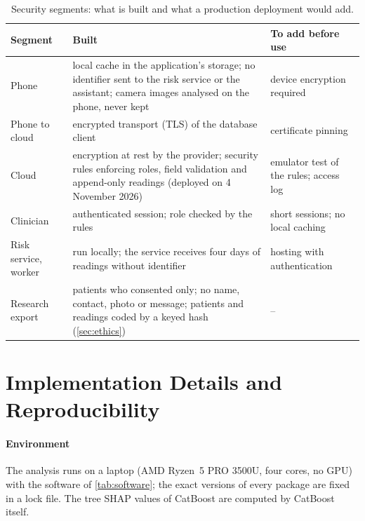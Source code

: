 \begin{table}[htbp]
\centering\footnotesize
\caption{Security segments: what is built and what a production deployment would add.}\label{tab:security-segments}
\begin{tabularx}{\textwidth}{@{}>{\raggedright\arraybackslash}p{2.8cm} X >{\raggedright\arraybackslash}p{4.2cm}@{}}
\toprule
\textbf{Segment} & \textbf{Built} & \textbf{To add before use} \\
\midrule
Phone & local cache in the application's storage; no identifier sent to the risk service or the assistant; camera images analysed on the phone, never kept & device encryption required \\
Phone to cloud & encrypted transport (TLS) of the database client & certificate pinning \\
Cloud & encryption at rest by the provider; security rules enforcing roles, field validation and append-only readings (deployed on 4 November 2026) & emulator test of the rules; access log \\
Clinician & authenticated session; role checked by the rules & short sessions; no local caching \\
Risk service, worker & run locally; the service receives four days of readings without identifier & hosting with authentication \\
Research export & patients who consented only; no name, contact, photo or message; patients and readings coded by a keyed hash (\cref{sec:ethics}) & -- \\
\bottomrule
\end{tabularx}
\end{table}

\section{Implementation Details and Reproducibility}\label{sec:tools}

\paragraph{Environment} The analysis runs on a laptop (AMD Ryzen~5 PRO 3500U, four cores, no GPU) with the software of \cref{tab:software}; the exact versions of every package are fixed in a lock file. The tree SHAP values of CatBoost are computed by CatBoost itself.

